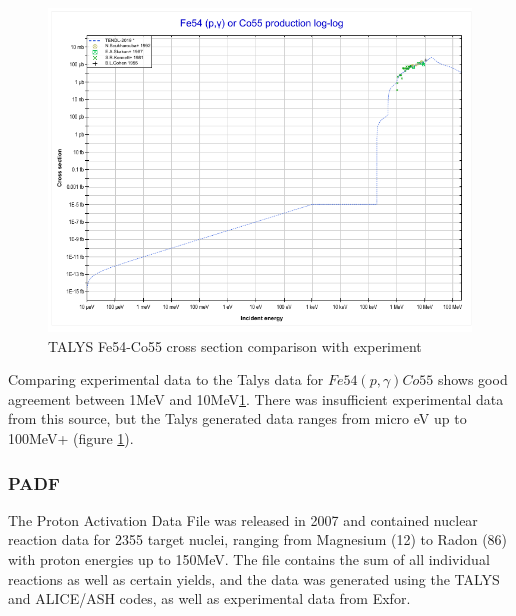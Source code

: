 \begin{figure}[tbp]
  \begin{center}
    \includegraphics[width=.6\linewidth]{chapters/isotope_activation_and_radioactive_decay/images/Fe54-Co55.png}
    \caption{TALYS Fe54-Co55 cross section comparison with experiment \cite{tendlfeco}}
    \label{fig:Fe54-Co55}
  \end{center}
\end{figure}

Comparing experimental data to the Talys data for $Fe54(p, \gamma)Co55$ shows good agreement between 1MeV and 10MeV\ref{fig:Fe54-Co55}.  There was insufficient experimental data from this source, but the Talys generated data ranges from micro eV up to 100MeV+ (figure \ref{fig:Fe54-Co55}).


\FloatBarrier
\subsubsection{PADF}

The Proton Activation Data File was released in 2007 and contained nuclear reaction data for 2355 target nuclei, ranging from Magnesium (12) to Radon (86) with proton energies up to 150MeV.  The file contains the sum of all individual reactions as well as certain yields, and the data was generated using the TALYS and ALICE/ASH codes, as well as experimental data from Exfor\cite{exforlink}.


